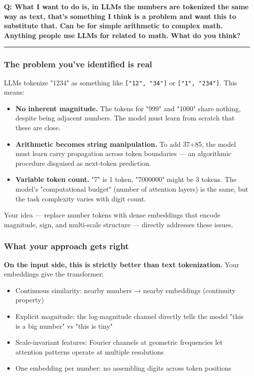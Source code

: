 \documentclass[11pt]{article}
\begin{document}
\textbf{Q: What I want to do is, in LLMs the numbers are tokenized the same way as text, that's something I think is a problem and want this to substitute that. Can be for simple arithmetic to complex math. Anything people use LLMs for related to math. What do you think?}


\noindent\rule{\textwidth}{0.4pt}


\subsubsection*{The problem you've identified is real}


LLMs tokenize "1234" as something like \texttt{["12", "34"]} or \texttt{["1", "234"]}. This means:


\begin{itemize}
\item \textbf{No inherent magnitude.} The tokens for "999" and "1000" share nothing, despite being adjacent numbers. The model must learn from scratch that these are close.
\item \textbf{Arithmetic becomes string manipulation.} To add 37+85, the model must learn carry propagation across token boundaries — an algorithmic procedure disguised as next-token prediction.
\item \textbf{Variable token count.} "7" is 1 token, "7000000" might be 3 tokens. The model's "computational budget" (number of attention layers) is the same, but the task complexity varies with digit count.
\end{itemize}


Your idea — replace number tokens with dense embeddings that encode magnitude, sign, and multi-scale structure — directly addresses these issues.


\subsubsection*{What your approach gets right}


\textbf{On the input side, this is strictly better than text tokenization.} Your embeddings give the transformer:


\begin{itemize}
\item Continuous similarity: nearby numbers → nearby embeddings (continuity property)
\item Explicit magnitude: the log-magnitude channel directly tells the model "this is a big number" vs "this is tiny"
\item Scale-invariant features: Fourier channels at geometric frequencies let attention patterns operate at multiple resolutions
\item One embedding per number: no assembling digits across token positions
\end{itemize}
\end{document}
